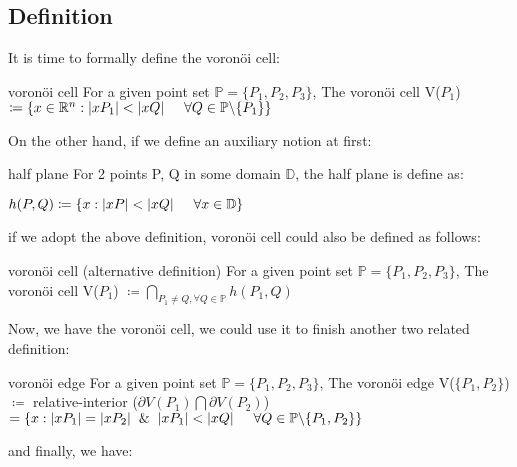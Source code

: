 \documentclass[12pt]{article}
\numberwithin{equation}{section}
\let\bb\mathbb
\newenvironment{general}[2][]{\begin{box_for_gene}[#1]{#2}}{\end{box_for_gene}}
\let\bb\mathbb
\begin{document}
		\subsection{Definition}
			It is time to formally define the voronöi cell:
			\vspace{5mm}
		\begin{general}[vor]{voronöi cell}
			For a given point set $\bb{P} = \{ P_1, P_2, P_3 \}$,
			The voronöi cell V($P_1$) $\coloneqq \{ x \in \bb{R}^n : |xP_1| < |xQ| \hspace{5mm} \forall Q\in \bb{P}  \backslash \{ P_1 \}\}$
		\end{general}
		
		On the other hand, if we define an auxiliary notion at first:
		 	\vspace{5mm}
		
		\begin{general}[half_plane]{half plane}
			For 2 points P, Q in some domain $\bb{D}$, the half plane is define as: \par 
			$h(P,Q) \coloneqq \{ x: |xP|<|xQ| \hspace{5mm} \forall x \in \bb{D} \}$
			
			 
		\end{general}
	
	if we adopt the above definition, voronöi cell could also be defined as follows:
	
		\begin{general}[vor2]{voronöi cell (alternative definition)}
			For a given point set $\bb{P} = \{ P_1, P_2, P_3 \}$,
			The voronöi cell V($P_1$) $\coloneqq \underset{P_1 \neq Q, \forall Q \in \bb{P}}{\bigcap} h(P_1, Q)$
			
			
		\end{general}
		
	Now, we have the voronöi cell, we could use it to finish another two related definition:
	\begin{general}[vor_edge]{voronöi edge}
		For a given point set $\bb{P} = \{ P_1, P_2, P_3 \}$,
			The voronöi edge V($\{P_1, P_2\}$) $\coloneqq $ relative-interior ($\partial V(P_1) \bigcap \partial V(P_2)$) $= \{ x: |xP_1| = |xP_2| \hspace{2mm}\& \hspace{2mm}|xP_1| < |xQ| \hspace{5mm} \forall Q\in \bb{P}\backslash \{P_1, P_2 \}   \}$
			
	\end{general}
	
	and finally, we have:
	
\end{document}
